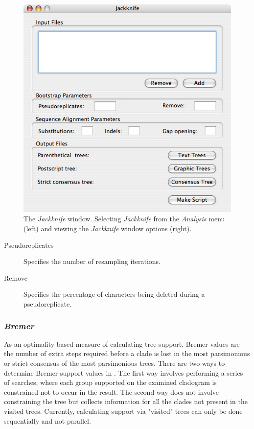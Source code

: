 {\begin{figure}
\begin{minipage}[c]{0.52\textwidth}
	   	\includegraphics[width=\textwidth]{doc/figures/jackknife_window.jpg}
   	\end{minipage}
\caption{The \emph{Jackknife} window. Selecting \emph{Jackknife} from the \emph{Analysis} menu (left) and 
viewing the \emph{Jackknife} window options (right).}
\label{fig:jackknife}
\end{figure}

\begin{description}
    \item[Pseudoreplicates] Specifies the number of resampling iterations.
    \item[Remove] Specifies the percentage of characters being deleted during a pseudoreplicate.
\end{description}

\subsubsection*{\emph{Bremer}}

As an optimality-based measure of calculating tree support, Bremer values are the number of extra steps required before a clade is lost 
in the most parsimonious or strict consensus of the most parsimonious trees.  There are two ways to determine Bremer support values in \poy.  
The first way involves performing a series of searches, where each group supported on the examined cladogram is constrained not to occur in 
the result.  The second way does not involve constraining the tree but collects information for all the clades not present in the visited trees.
Currently, calculating support via "visited" trees can only be done sequentially and not parallel.

}
